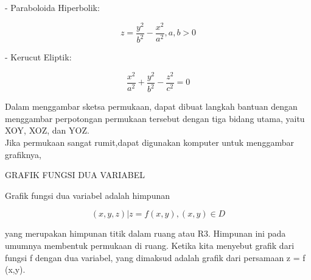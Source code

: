\documentclass[12pt,arial,letterpaper]{book}
\begin{document}
\begin{eulercomment}
\begin{eulercomment}
\begin{eulercomment}
\begin{eulercomment}
\begin{eulercomment}
\begin{eulercomment}
\begin{eulercomment}
\begin{eulercomment}
\begin{eulercomment}
\begin{eulercomment}
\begin{eulercomment}
\begin{eulercomment}
\begin{eulercomment}
\begin{eulercomment}
\begin{eulercomment}
\begin{eulercomment}
\begin{eulercomment}
\begin{eulercomment}
\begin{eulercomment}
- Paraboloida Hiperbolik:\\
\end{eulercomment}
\begin{eulerformula}
\[
z=\frac{y^2}{b^2}-\frac{x^2}{a^2}, a,b>0
\]
\end{eulerformula}
\begin{eulercomment}
- Kerucut Eliptik:\\
\end{eulercomment}
\begin{eulerformula}
\[
\frac{x^2}{a^2}+\frac{y^2}{b^2}-\frac{z^2}{c^2}=0
\]
\end{eulerformula}
\begin{eulercomment}
Dalam menggambar sketsa permukaan, dapat dibuat langkah bantuan dengan
menggambar perpotongan permukaan tersebut dengan tiga bidang utama,
yaitu XOY, XOZ, dan YOZ.\\
Jika permukaan sangat rumit,dapat digunakan komputer untuk menggambar
grafiknya,


GRAFIK FUNGSI DUA VARIABEL

Grafik fungsi dua variabel adalah himpunan\\
\end{eulercomment}
\begin{eulerformula}
\[
{(x,y,z)| z = f (x,y),(x,y) \in D}
\]
\end{eulerformula}
\begin{eulercomment}
yang merupakan himpunan titik dalam ruang atau R3. Himpunan ini pada
umumnya membentuk permukaan di ruang. Ketika kita menyebut grafik dari
fungsi f dengan dua variabel, yang dimaksud adalah grafik dari
persamaan z = f (x,y).


\end{eulercomment}
\end{eulercomment}
\end{eulercomment}
\end{eulercomment}
\end{eulercomment}
\end{eulercomment}
\end{eulercomment}
\end{eulercomment}
\end{eulercomment}
\end{eulercomment}
\end{eulercomment}
\end{eulercomment}
\end{eulercomment}
\end{eulercomment}
\end{eulercomment}
\end{eulercomment}
\end{eulercomment}
\end{eulercomment}
\end{eulercomment}
\end{document}
